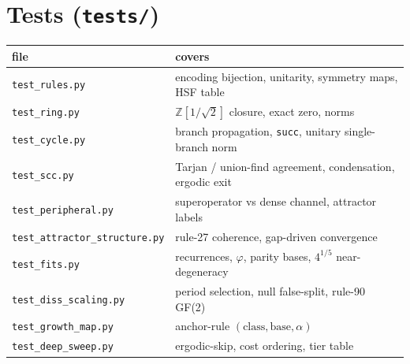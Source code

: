 \documentclass[11pt]{article}
\newcommand{\pf}[1]{\texttt{#1}}          %
\newcommand{\fn}[1]{\texttt{#1}}          %
\newcommand{\Zh}{\mathbb{Z}[1/\sqrt2]}
\begin{document}
\section{Tests (\pf{tests/})}
\label{sec:tests}
\begin{center}\small
\begin{tabular}{@{}ll@{}}
\toprule
file & covers \\
\midrule
\pf{test\_rules.py} & encoding bijection, unitarity, symmetry maps, HSF table \\
\pf{test\_ring.py} & $\Zh$ closure, exact zero, norms \\
\pf{test\_cycle.py} & branch propagation, \fn{succ}, unitary single-branch norm \\
\pf{test\_scc.py} & Tarjan / union-find agreement, condensation, ergodic exit \\
\pf{test\_peripheral.py} & superoperator vs dense channel, attractor labels \\
\pf{test\_attractor\_structure.py} & rule-27 coherence, gap-driven convergence \\
\pf{test\_fits.py} & recurrences, $\varphi$, parity bases, $4^{1/5}$ near-degeneracy \\
\pf{test\_diss\_scaling.py} & period selection, null false-split, rule-90 GF(2) \\
\pf{test\_growth\_map.py} & anchor-rule $(\text{class},\text{base},\alpha)$ \\
\pf{test\_deep\_sweep.py} & ergodic-skip, cost ordering, tier table \\
\bottomrule
\end{tabular}
\end{center}

\end{document}
